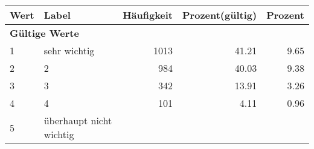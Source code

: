      \begin{longtable}{lXrrr}
     \toprule
     \textbf{Wert} & \textbf{Label} & \textbf{Häufigkeit} & \textbf{Prozent(gültig)} & \textbf{Prozent} \\
     \endhead
     \midrule
     \multicolumn{5}{l}{\textbf{Gültige Werte}}\\

     1 &
     \multicolumn{1}{X}{ sehr wichtig   } &


       \num{1013} &
       \num[round-mode=places,round-precision=2]{41.21} &
         \num[round-mode=places,round-precision=2]{9.65} \\

     2 &
     \multicolumn{1}{X}{ 2   } &


       \num{984} &
       \num[round-mode=places,round-precision=2]{40.03} &
         \num[round-mode=places,round-precision=2]{9.38} \\

     3 &
     \multicolumn{1}{X}{ 3   } &


       \num{342} &
       \num[round-mode=places,round-precision=2]{13.91} &
         \num[round-mode=places,round-precision=2]{3.26} \\

     4 &
     \multicolumn{1}{X}{ 4   } &


       \num{101} &
       \num[round-mode=places,round-precision=2]{4.11} &
         \num[round-mode=places,round-precision=2]{0.96} \\

     5 &
     \multicolumn{1}{X}{ überhaupt nicht wichtig   } &



\end{longtable}
